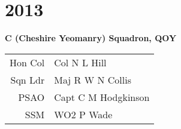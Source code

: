 \chapter*{2013}

\begin{center}
  \Large
  \textbf{C (Cheshire Yeomanry) Squadron, QOY}
\end{center}

\begin{center}
  \begin{tabular}{rl}
    Hon Col & Col N L Hill \\
    Sqn Ldr & Maj R W N Collis \\
    PSAO & Capt C M Hodgkinson \\
    SSM & WO2 P Wade \\
  \end{tabular}
\end{center}
